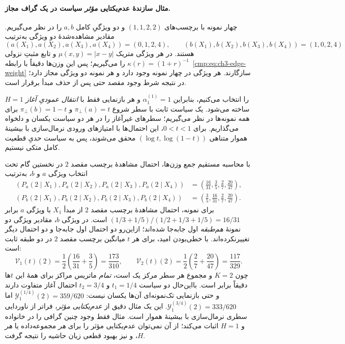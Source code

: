 \paragraph{مثال سازندهٔ عدم‌یکتایی \emph{مؤثر} سیاست در یک گراف مجاز.}
چهار نمونه با برچسب‌های $(1,1,2,2)$ و دو ویژگیِ کامل $a,b$
را در نظر می‌گیریم. مقادیر مشاهده‌شدهٔ دو ویژگی به‌ترتیب
\[
(a(X_1),a(X_2),a(X_3),a(X_4))=(0,1,2,4),\qquad
(b(X_1),b(X_2),b(X_3),b(X_4))=(1,0,2,4)
\]
هستند. در هر ویژگی متریک $\mu(x,y)=|x-y|$ و
تابع مثبتِ نزولی $\kappa(r)=(1+r)^{-1}$ را می‌گیریم؛
پس این وزن‌ها دقیقاً با رابطه~\eqref{cmp:eq:ch3-edge-weight} سازگارند.
هر ویژگی در چهار نمونه وجود دارد و هر نمونه دو ویژگی مجاز دارد؛
در نتیجه شرط وجود مقصد حتی پس از حذف مبدأ برقرار است.

$H=1$ را انتخاب می‌کنیم، بنابراین
$\alpha_1^{(1)}=1$ و هر بازنمایی فقط با
\emph{انتقال عمودیِ آغاز} ساخته می‌شود. یک سیاست ثابت
 با سطر شروع
$\pi_{\bot}(a)=t$ و $\pi_{\bot}(b)=1-t$
برای همه نمونه‌ها در نظر می‌گیریم؛ سطرهای غیرآغاز را در هر
دو سیاست یکسان و دلخواه می‌گذاریم. برای $0<t<1$،
این احتمال‌ها با امتیازهای ورودی نرمال‌سازی با بیشینهٔ هموار متناهی
$(\log t,\log(1-t))$ محقق می‌شوند، پس به سیاست حدیِ
قطعیت کامل متکی نیستیم.

با محاسبه مستقیم جمع وزن‌ها، احتمال مشاهدهٔ برچسب مقصد $2$
در نخستین گام تحت انتخاب ویژگی $a$ و $b$، به‌ترتیب
\[
\begin{aligned}
(P_a(2\mid X_1),P_a(2\mid X_2),P_a(2\mid X_3),P_a(2\mid X_4))
&=\left(\frac{16}{31},\frac35,\frac27,\frac{20}{47}\right),\\
(P_b(2\mid X_1),P_b(2\mid X_2),P_b(2\mid X_3),P_b(2\mid X_4))
&=\left(\frac35,\frac{16}{31},\frac27,\frac{20}{47}\right).
\end{aligned}
\]
برای نمونه، احتمال مشاهدهٔ برچسب مقصد $2$ از مبدأ $X_1$ با ویژگی $a$ برابر
$(1/3+1/5)/(1/2+1/3+1/5)=16/31$ است.
در ویژگی $b$، مقادیر ویژگی دو نمونهٔ \emph{هم‌طبقه} اول
جابه‌جا شده‌اند؛ ازاین‌رو دو احتمال اول جابه‌جا و دو
احتمال دیگر تغییرنکرده‌اند. با خطی‌بودن امید، برای هر $t$
میانگین برچسب مقصد $2$ در دو طبقه ثابت است:
\begin{equation}\label{eq:app-ch3-effective-nonunique-example}
\boxed{
\mathcal V_1(t)(2)=\frac12\left(\frac{16}{31}+\frac35\right)
=\frac{173}{310},\qquad
\mathcal V_2(t)(2)=\frac12\left(\frac27+\frac{20}{47}\right)
=\frac{117}{329}.}
\end{equation}
چون $K=2$ و مجموع هر سطر مرکز یک است، \emph{تمام}
ماتریس مراکز برای همهٔ این $t$ها دقیقاً برابر است.
بااین‌حال دو سیاست $t_1=1/4$ و $t_2=3/4$
احتمال آغاز متفاوت دارند و حتی بازنمایی تک‌نمونه‌ای آن‌ها
یکسان نیست: $\mathscr Y_1^{(1/4)}(2)=359/620$
اما $\mathscr Y_1^{(3/4)}(2)=333/620$.
این یک مثال دقیق از \emph{عدم‌یکتایی مؤثر}، فراتر از
ناوردایی سطری نرمال‌سازی با بیشینهٔ هموار است. مثال فقط وجود چنین گرافی
را در خانواده  و $H=1$ اثبات می‌کند؛
از آن نمی‌توان عدم‌یکتایی مؤثر را برای \emph{هر} مجموعه‌داده یا \emph{هر} $H$،
و نیز بهبود قطعی زیان حاشیه را نتیجه گرفت.


